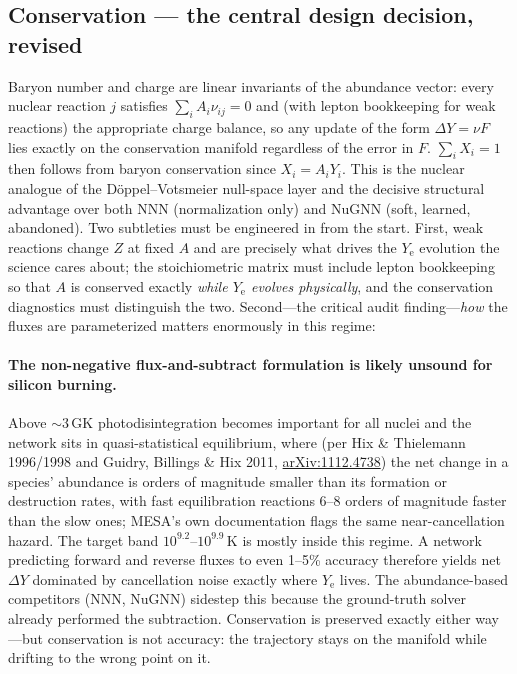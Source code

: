 \documentclass[11pt,a4paper]{article}
\newcommand{\Ye}{\ensuremath{Y_{\mathrm{e}}}}
\newcommand{\arxiv}[1]{\href{https://arxiv.org/abs/#1}{arXiv:#1}}
\begin{document}
\subsection{Conservation --- the central design decision, revised}
\label{sec:conservation}

Baryon number and charge are linear invariants of the abundance vector: every nuclear reaction $j$ satisfies $\sum_i A_i \nu_{ij} = 0$ and (with lepton bookkeeping for weak reactions) the appropriate charge balance, so any update of the form $\Delta Y = \nu F$ lies exactly on the conservation manifold regardless of the error in $F$. $\sum_i X_i = 1$ then follows from baryon conservation since $X_i = A_i Y_i$. This is the nuclear analogue of the D\"oppel--Votsmeier null-space layer and the decisive structural advantage over both NNN (normalization only) and NuGNN (soft, learned, abandoned). Two subtleties must be engineered in from the start. First, weak reactions change $Z$ at fixed $A$ and are precisely what drives the \Ye{} evolution the science cares about; the stoichiometric matrix must include lepton bookkeeping so that $A$ is conserved exactly \emph{while \Ye{} evolves physically}, and the conservation diagnostics must distinguish the two. Second---the critical audit finding---\emph{how} the fluxes are parameterized matters enormously in this regime:

\paragraph{The non-negative flux-and-subtract formulation is likely unsound for silicon burning.}
Above ${\sim}3$\,GK photodisintegration becomes important for all nuclei and the network sits in quasi-statistical equilibrium, where (per Hix \& Thielemann 1996/1998 and Guidry, Billings \& Hix 2011, \arxiv{1112.4738}) the net change in a species' abundance is orders of magnitude smaller than its formation or destruction rates, with fast equilibration reactions 6--8 orders of magnitude faster than the slow ones; MESA's own documentation flags the same near-cancellation hazard. The target band $10^{9.2}$--$10^{9.9}$\,K is mostly inside this regime. A network predicting forward and reverse fluxes to even 1--5\% accuracy therefore yields net $\Delta Y$ dominated by cancellation noise exactly where \Ye{} lives. The abundance-based competitors (NNN, NuGNN) sidestep this because the ground-truth solver already performed the subtraction. Conservation is preserved exactly either way---but conservation is not accuracy: the trajectory stays on the manifold while drifting to the wrong point on it.
\end{document}
